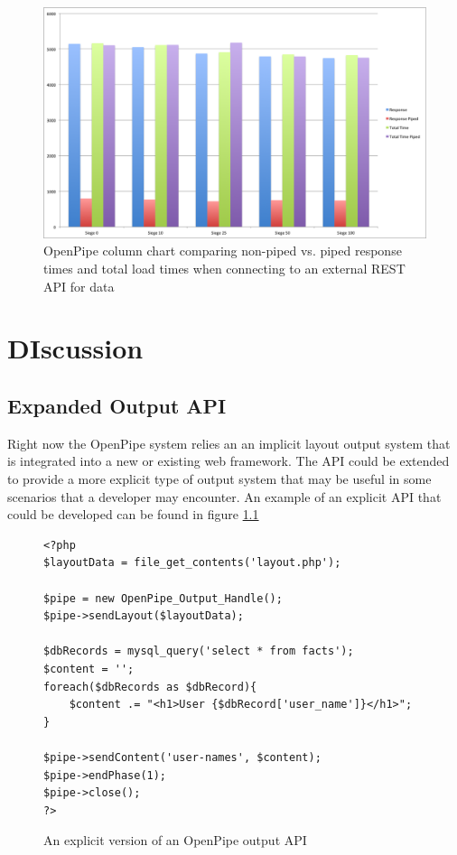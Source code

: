 \documentclass[12pt]{report}
\begin{document}
\begin{figure}[H]
\label{fig:analysisChartWebService}
\centering
\includegraphics[width=\textwidth,keepaspectratio]{figures/images/analysis_chart_webservice.png}
\caption{OpenPipe column chart comparing non-piped vs. piped response times and total load times when connecting to an external REST API for data}
\end{figure}

\chapter{DIscussion}

\section{Expanded Output API}

Right now the OpenPipe system relies an an implicit layout output system that is integrated into a new or existing web framework. The API could be extended to provide a more explicit type of output system that may be useful in some scenarios that a developer may encounter. An example of an explicit API that could  be developed can be found in figure \ref{fig:explicitApi}

\begin{figure}[H]
\label{fig:explicitApi}
\begin{lstlisting}
<?php
$layoutData = file_get_contents('layout.php');

$pipe = new OpenPipe_Output_Handle();
$pipe->sendLayout($layoutData);

$dbRecords = mysql_query('select * from facts');
$content = '';
foreach($dbRecords as $dbRecord){
	$content .= "<h1>User {$dbRecord['user_name']}</h1>";
}

$pipe->sendContent('user-names', $content);
$pipe->endPhase(1);
$pipe->close();
?>
\end{lstlisting}
\caption{An explicit version of an OpenPipe output API}
\end{figure}
\end{document}

